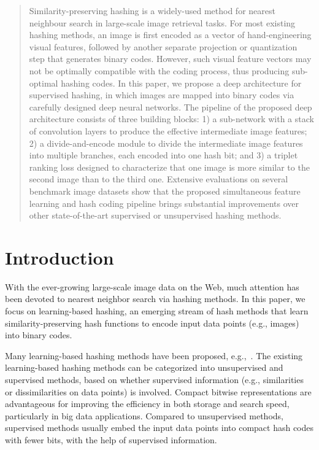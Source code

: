 \documentclass[10pt,twocolumn,letterpaper]{article}
\begin{document}
\begin{abstract}
  Similarity-preserving hashing is a widely-used method for nearest neighbour search in large-scale image retrieval tasks. For most existing hashing methods, an image is first encoded as a vector of hand-engineering visual features, followed by another separate projection or quantization step that generates binary codes. However, such visual feature vectors may not be optimally compatible with the coding process, thus producing sub-optimal hashing codes. In this paper, we propose a deep architecture for supervised hashing, in which images are mapped into binary codes via carefully designed deep neural networks. The pipeline of the proposed deep architecture consists of three building blocks: 1) a sub-network with a stack of convolution layers to produce the effective intermediate image features; 2) a divide-and-encode module to divide the intermediate image features into multiple branches, each encoded into one hash bit; and 3) a triplet ranking loss designed to characterize that one image is more similar to the second image than to the third one. Extensive evaluations on several benchmark image datasets show that the proposed simultaneous feature learning and hash coding pipeline brings substantial improvements over other state-of-the-art supervised or unsupervised hashing methods.
\end{abstract}

\section{Introduction}
With the ever-growing large-scale image data on the Web, much
attention has been devoted to nearest neighbor search via hashing
methods. In this paper, we focus on learning-based hashing, an
emerging stream of hash methods that learn similarity-preserving
hash functions to encode input data points (e.g., images) into
binary codes.

 Many learning-based hashing methods have been proposed, e.g.,~\cite{BRE,KLSH,ITQ,KSH,MLH,CNNH,liu2013hash,wang2012semi,gong2013learning}.
The existing learning-based hashing methods can be categorized into
unsupervised and supervised methods, based on whether supervised
information (e.g., similarities or dissimilarities on data points)
is involved. Compact bitwise representations are advantageous for
improving the efficiency in both storage and search speed,
particularly in big data applications. Compared to unsupervised
methods, supervised methods usually embed the input data points into
compact hash codes with fewer bits, with the help of supervised
information.
\end{document}
